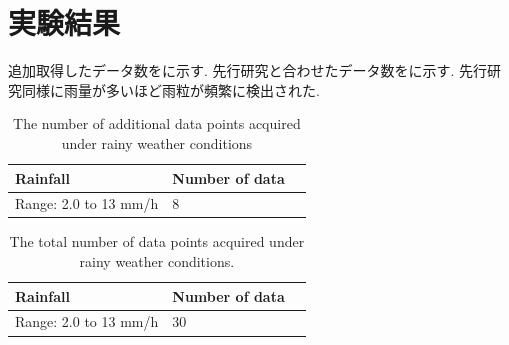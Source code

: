 \section{実験結果}
追加取得したデータ数をに示す.
先行研究\cite{mura}と合わせたデータ数をに示す.
先行研究\cite{mura}同様に雨量が多いほど雨粒が頻繁に検出された.

\begin{table}[htbp]
  \centering
  \footnotesize
  \caption{The number of additional data points acquired under rainy weather conditions}
  \label{table:Additional_number_of_data_acquired}
  \begin{tabular}{|l|l|r|}
  \hline
  Rainfall & \multicolumn{1}{l|}{Number of data} \\
  \hline
  Range: 2.0 to 13 mm/h & 8 \\
  \hline
  \end{tabular}
\end{table}

\begin{table}[htbp]
  \centering
  \footnotesize
  \caption{The total number of data points acquired under rainy weather conditions.}
  \label{table:Total_number_of_data_acquired}
  \begin{tabular}{|l|l|r|}
  \hline
  Rainfall & \multicolumn{1}{l|}{Number of data} \\
  \hline
  Range: 2.0 to 13 mm/h & 30 \\
  \hline
  \end{tabular}
\end{table}